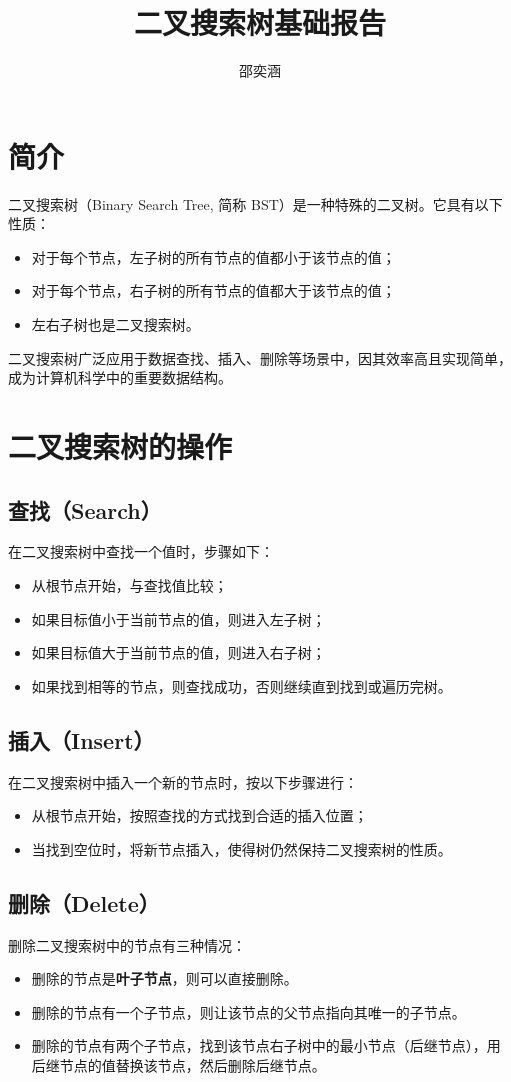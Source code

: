 \documentclass[a4paper,12pt]{report}
\title{二叉搜索树基础报告}
\author{邵奕涵}
\date{}
\begin{document}
\maketitle
\tableofcontents %

\chapter{简介}
二叉搜索树（Binary Search Tree, 简称 BST）是一种特殊的二叉树。它具有以下性质：
\begin{itemize}
    \item 对于每个节点，左子树的所有节点的值都小于该节点的值；
    \item 对于每个节点，右子树的所有节点的值都大于该节点的值；
    \item 左右子树也是二叉搜索树。
\end{itemize}
二叉搜索树广泛应用于数据查找、插入、删除等场景中，因其效率高且实现简单，成为计算机科学中的重要数据结构。

\chapter{二叉搜索树的操作}
\section{查找（Search）}
在二叉搜索树中查找一个值时，步骤如下：
\begin{itemize}
    \item 从根节点开始，与查找值比较；
    \item 如果目标值小于当前节点的值，则进入左子树；
    \item 如果目标值大于当前节点的值，则进入右子树；
    \item 如果找到相等的节点，则查找成功，否则继续直到找到或遍历完树。
\end{itemize}

\section{插入（Insert）}
在二叉搜索树中插入一个新的节点时，按以下步骤进行：
\begin{itemize}
    \item 从根节点开始，按照查找的方式找到合适的插入位置；
    \item 当找到空位时，将新节点插入，使得树仍然保持二叉搜索树的性质。
\end{itemize}

\section{删除（Delete）}
删除二叉搜索树中的节点有三种情况：
\begin{itemize}
    \item 删除的节点是\textbf{叶子节点}，则可以直接删除。
    \item 删除的节点有一个子节点，则让该节点的父节点指向其唯一的子节点。
    \item 删除的节点有两个子节点，找到该节点右子树中的最小节点（后继节点），用后继节点的值替换该节点，然后删除后继节点。
\end{itemize}
\end{document}

